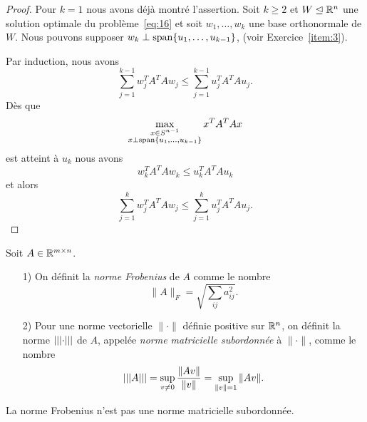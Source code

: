 \begin{proof}
Pour $k=1$ nous avons déjà montré l'assertion. Soit $k \geq 2$ et $W \trianglelefteq \mathbb{R}^n$ une solution optimale du problème~\eqref{eq:16} et soit $w_1,\dots,w_k$ une base orthonormale de $W$. 
Nous pouvons supposer $w_k \perp \operatorname{span}\{u_1,\dots,u_{k-1}\}$, (voir Exercice~\ref{item:3}). 

Par induction, nous avons 
\begin{displaymath}
  \sum_{j=1}^{k-1} w_j^TA^TAw_j \leq  \sum_{j=1}^{k-1} u_j^TA^TAu_j.
\end{displaymath}
Dès que   
\begin{displaymath}
  \max_{\substack{x \in S^{n-1} \\ x \perp \operatorname{span}\{u_1,\dots,u_{k-1}\}}} x^TA^TAx 
\end{displaymath}
est atteint à $u_k$ nous avons 
\begin{displaymath}
  w_k^TA^TAw_k \leq u_k^TA^TAu_k
\end{displaymath}
et alors
\begin{displaymath}
  \sum_{j=1}^{k} w_j^TA^TAw_j \leq  \sum_{j=1}^{k} u_j^TA^TAu_j.
\end{displaymath}

\end{proof}


\begin{definition}
  \label{def:26}
  Soit $A \in \mathbb{R}^{m \times n}$.
  \begin{enumerate}
 
  \item[1)] On définit la \emph{norme Frobenius} de $A$ comme le nombre 
  \begin{displaymath}
    \|A\|_F = \sqrt{\sum_{ij}a_{ij}^2}.
  \end{displaymath}
  
  \item[2)] Pour une norme vectorielle $\|\cdot\|$ définie positive sur $\Bbb R^n$, on définit la norme $\lvert\lvert\lvert\cdot\rvert\rvert\rvert$ de $A$, appelée \emph{norme matricielle subordonnée} à $\|\cdot\|$, comme le nombre 
   \begin{displaymath}
    	\lvert\lvert\lvert A\rvert\rvert\rvert = \sup_{v \neq 0} \frac{\|Av\|}{\|v\|} = \sup_{\|v\| = 1} \|Av\|.
  \end{displaymath}
  
   \end{enumerate}
\end{definition}

\begin{remark}
	La norme Frobenius n'est pas une norme matricielle subordonnée.
\end{remark}

